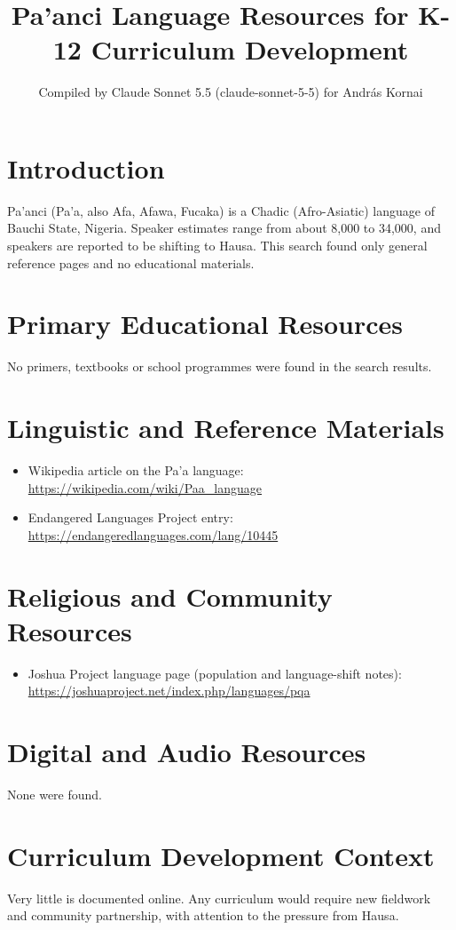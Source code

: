 \documentclass[12pt]{article}
\title{Pa'anci Language Resources for K-12 Curriculum Development}
\author{Compiled by Claude Sonnet 5.5 (claude-sonnet-5-5) for Andr\'as Kornai}
\date{}
\begin{document}
\maketitle
\section{Introduction}
Pa'anci (Pa'a, also Afa, Afawa, Fucaka) is a Chadic (Afro-Asiatic) language of Bauchi State, Nigeria. Speaker estimates range from about 8,000 to 34,000, and speakers are reported to be shifting to Hausa. This search found only general reference pages and no educational materials.
\section{Primary Educational Resources}
No primers, textbooks or school programmes were found in the search results.
\section{Linguistic and Reference Materials}
\begin{itemize}
\item Wikipedia article on the Pa'a language: \url{https://wikipedia.com/wiki/Paa_language}
\item Endangered Languages Project entry: \url{https://endangeredlanguages.com/lang/10445}
\end{itemize}
\section{Religious and Community Resources}
\begin{itemize}
\item Joshua Project language page (population and language-shift notes): \url{https://joshuaproject.net/index.php/languages/pqa}
\end{itemize}
\section{Digital and Audio Resources}
None were found.
\section{Curriculum Development Context}
Very little is documented online. Any curriculum would require new fieldwork and community partnership, with attention to the pressure from Hausa.
\end{document}
